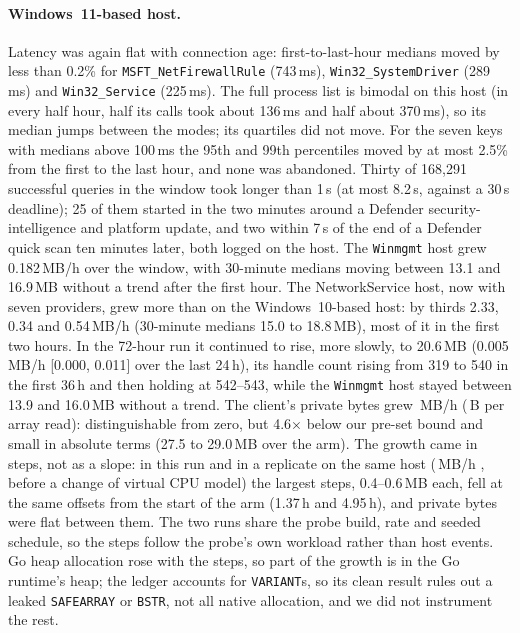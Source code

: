 \documentclass[letterpaper,twocolumn,10pt]{article}
\newcommand{\code}[1]{\texttt{\small #1}}
\begin{document}
\paragraph{Windows~11-based host.}
Latency was again flat with connection age: first-to-last-hour medians moved by less than 0.2\% for \code{MSFT\_NetFirewallRule} (743\,ms), \code{Win32\_SystemDriver} (289\,ms) and \code{Win32\_Service} (225\,ms).
The full process list is bimodal on this host (in every half hour, half its calls took about 136\,ms and half about 370\,ms), so its median jumps between the modes; its quartiles did not move.
For the seven keys with medians above 100\,ms the 95th and 99th percentiles moved by at most 2.5\% from the first to the last hour, and none was abandoned.
Thirty of 168{,}291 successful queries in the window took longer than 1\,s (at most 8.2\,s, against a 30\,s deadline); 25 of them started in the two minutes around a Defender security-intelligence and platform update, and two within 7\,s of the end of a Defender quick scan ten minutes later, both logged on the host.
The \code{Winmgmt} host grew 0.182\,MB/h over the window, with 30-minute medians moving between 13.1 and 16.9\,MB without a trend after the first hour.
The NetworkService host, now with seven providers, grew more than on the Windows~10-based host: by thirds 2.33, 0.34 and 0.54\,MB/h (30-minute medians 15.0 to 18.8\,MB), most of it in the first two hours.
In the 72-hour run it continued to rise, more slowly, to 20.6\,MB (0.005\,MB/h [0.000, 0.011] over the last 24\,h), its handle count rising from 319 to 540 in the first 36\,h and then holding at 542--543, while the \code{Winmgmt} host stayed between 13.9 and 16.0\,MB without a trend.
The client's private bytes grew \STbPrivSlope{}\,MB/h \STbPrivCI{} (\STbPerRead{}\,B per array read): distinguishable from zero, but 4.6$\times$ below our pre-set bound and small in absolute terms (27.5 to 29.0\,MB over the arm).
The growth came in steps, not as a slope: in this run and in a replicate on the same host (\STrPrivSlope{}\,MB/h \STrPrivCI{}, before a change of virtual CPU model) the largest steps, 0.4--0.6\,MB each, fell at the same offsets from the start of the arm (1.37\,h and 4.95\,h), and private bytes were flat between them.
The two runs share the probe build, rate and seeded schedule, so the steps follow the probe's own workload rather than host events.
Go heap allocation rose with the steps, so part of the growth is in the Go runtime's heap; the ledger accounts for \code{VARIANT}s, so its clean result rules out a leaked \code{SAFEARRAY} or \code{BSTR}, not all native allocation, and we did not instrument the rest.
\end{document}
